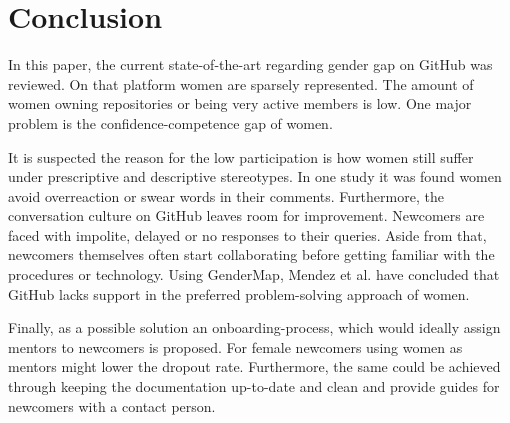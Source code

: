 \documentclass[a4paper, 11pt]{article}
\begin{document}
\section{Conclusion}
In this paper, the current state-of-the-art regarding gender gap on GitHub was reviewed. On that platform women are sparsely represented. The amount of women owning repositories or being very active members is low. One major problem is the confidence-competence gap of women. \newline 

It is suspected the reason for the low participation is how women still suffer under prescriptive and descriptive stereotypes. In one study it was found women avoid overreaction or swear words in their comments. Furthermore, the conversation culture on GitHub leaves room for improvement. Newcomers are faced with impolite, delayed or no responses to their queries. Aside from that, newcomers themselves often start collaborating before getting familiar with the procedures or technology. Using GenderMap, Mendez et al. have concluded that GitHub lacks support in the preferred problem-solving approach of women. \newline

Finally, as a possible solution an onboarding-process, which would ideally assign mentors to newcomers is proposed. For female newcomers using women as mentors might lower the dropout rate. Furthermore, the same could be achieved through keeping the documentation up-to-date and clean and provide guides for newcomers with a contact person.



\nocite{*}


\doclicenseThis
\end{document}
